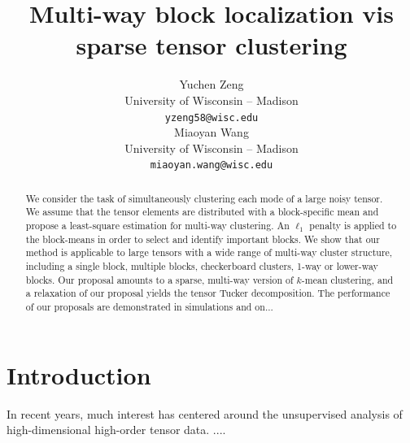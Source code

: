 \documentclass{article}
\title{Multi-way block localization vis sparse tensor clustering}
\author{%
Yuchen Zeng \\
 University of Wisconsin -- Madison\\
 \texttt{yzeng58@wisc.edu} \\
\And
Miaoyan Wang \\
 University of Wisconsin -- Madison\\
\texttt{miaoyan.wang@wisc.edu} \\
}
\begin{document}

\maketitle

\begin{abstract}
 We consider the task of simultaneously clustering each mode of a large noisy tensor. We assume that the tensor elements are distributed with a block-specific mean and propose a least-square estimation for multi-way clustering. An $\ell_1$ penalty is applied to the block-means in order to select and identify important blocks. We show that our method is applicable to large tensors with a wide range of multi-way cluster structure, including a single block, multiple blocks, checkerboard clusters, 1-way or lower-way blocks. Our proposal amounts to a sparse, multi-way version of $k$-mean clustering, and a relaxation of our proposal yields the tensor Tucker decomposition. The performance of our proposals are demonstrated in simulations and on... 
\end{abstract}

\section{Introduction}
In recent years, much interest has centered around the unsupervised analysis of high-dimensional high-order tensor data. ....
\end{document}
